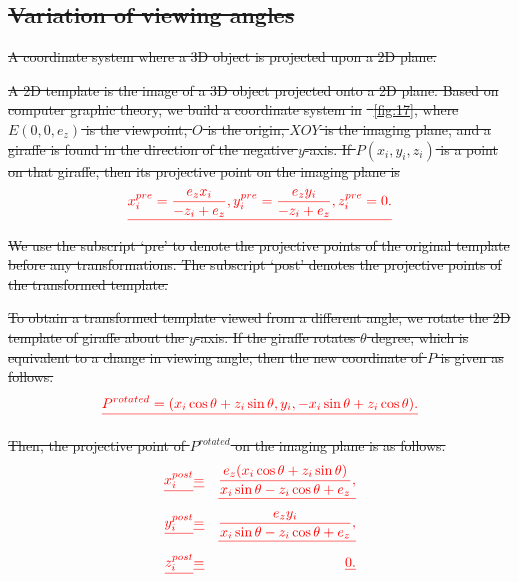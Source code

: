 \documentclass[journal]{IEEEtran}
\providecommand{\DIFdel}[1]{{\protect\color{red}\sout{#1}}}                      %
\begin{document}
\subsection{\DIFdel{Variation of viewing angles}}
\addtocounter{subsection}{-1}%

{%
\DIFdel{A coordinate system where a 3D object is projected upon a 2D plane.}}

\DIFdel{A 2D template is the image of a 3D object projected onto a 2D plane. 
Based on computer graphic theory, we build a coordinate system in }%
\DIFdel{~\ref{fig:17}, 
where $E(0,0,e_z)$ is the viewpoint, $O$ is the origin, $XOY$ is the imaging plane, 
and a giraffe is found in the direction of the negative $y$-axis.
If $P(x_i,y_i,z_i)$ is a point on that giraffe, 
then its projective point on the imaging plane is
}\begin{displaymath}\DIFdel{
x_i^{pre}=\frac{e_z x_i}{-z_i+e_z}, y_i^{pre}=\frac{e_z y_i}{-z_i+e_z}, z_i^{pre}=0.
\label{eqn:2}
}\end{displaymath}
\DIFdel{We use the subscript `pre' to denote the projective points of the original template before any transformations.
The subscript `post' denotes the projective points of the transformed template.
}%

\DIFdel{To obtain a transformed template viewed from a different angle,
we rotate the 2D template of giraffe about the $y$-axis.
If the giraffe rotates $\theta$ degree, which is equivalent to a change in viewing angle, 
then the new coordinate of $P$ is given as follows. 
}\begin{displaymath}\DIFdel{
P^{rotated}=(x_i \cos\theta+z_i \sin\theta,y_i,-x_i \sin\theta+z_i \cos\theta). 
}\end{displaymath}

\DIFdel{Then, the projective point of $P^{rotated}$ on the imaging plane is as follows.
}\begin{align*}\DIFdel{
x_i^{post}}&\DIFdel{=}&\DIFdel{\frac{e_z(x_i \cos\theta+z_i \sin\theta)}{x_i \sin\theta-z_i \cos\theta+e_z}, \nonumber}\\
\DIFdel{y_i^{post}}&\DIFdel{=}&\DIFdel{\frac{e_z y_i}{x_i \sin\theta-z_i \cos\theta+e_z}, \nonumber}\\
\DIFdel{z_i^{post}}&\DIFdel{=}&\DIFdel{0.
\label{eqn:4}
}\end{align*}
\end{document}
